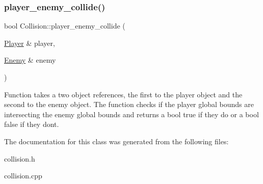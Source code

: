 \subsubsection{\texorpdfstring{player\+\_\+enemy\+\_\+collide()}{player\_enemy\_collide()}}
{\footnotesize\ttfamily bool Collision\+::player\+\_\+enemy\+\_\+collide (\begin{DoxyParamCaption}\item[{\hyperlink{classPlayer}{Player} \&}]{player,  }\item[{\hyperlink{classEnemy}{Enemy} \&}]{enemy }\end{DoxyParamCaption})}

Function takes a two object references, the first to the player object and the second to the enemy object. The function checks if the player global bounds are intersecting the enemy global bounds and returns a bool true if they do or a bool false if they don\textquotesingle{}t. 

The documentation for this class was generated from the following files\+:\begin{DoxyCompactItemize}
\item 
collision.\+h\item 
collision.\+cpp\end{DoxyCompactItemize}
